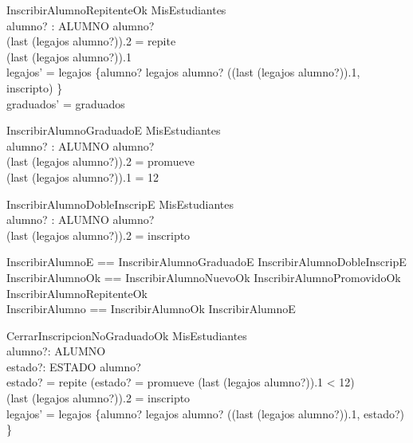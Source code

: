 \begin{schema}{InscribirAlumnoRepitenteOk}
    \Delta MisEstudiantes \\
    alumno? : ALUMNO
    \where
    alumno? \in {} \\
    (last \; (legajos \; alumno?)).2 = repite \\
    (last \; (legajos \; alumno?)).1  \\ 
    legajos' = legajos \oplus \{alumno? \mapsto legajos \; alumno? \cat \langle ((last \; (legajos \; alumno?)).1, inscripto) \rangle\} \\
    graduados' = graduados
\end{schema}

\begin{schema}{InscribirAlumnoGraduadoE}
    \Xi MisEstudiantes \\
    alumno? : ALUMNO
    \where
    alumno? \in {} \\
    (last \; (legajos \; alumno?)).2 = promueve \\
    (last \; (legajos \; alumno?)).1 = 12
\end{schema}

\begin{schema}{InscribirAlumnoDobleInscripE}
    \Xi MisEstudiantes \\
    alumno? : ALUMNO
    \where
    alumno? \in {} \\
    (last \; (legajos \; alumno?)).2 = inscripto
\end{schema}

\begin{zed}
    InscribirAlumnoE == InscribirAlumnoGraduadoE \lor InscribirAlumnoDobleInscripE \\
    InscribirAlumnoOk == InscribirAlumnoNuevoOk \lor InscribirAlumnoPromovidoOk \\ 
                         \lor InscribirAlumnoRepitenteOk \\
    InscribirAlumno == InscribirAlumnoOk \lor InscribirAlumnoE
\end{zed}

\begin{schema}{CerrarInscripcionNoGraduadoOk}
    \Delta MisEstudiantes \\
    alumno?: ALUMNO \\
    estado?: ESTADO
    \where
    alumno? \in {} \\
    estado? = repite \lor (estado? = promueve \land (last \; (legajos \; alumno?)).1 < 12) \\
    (last \; (legajos \; alumno?)).2 = inscripto \\
    legajos' = legajos \oplus \{alumno? \mapsto legajos \; alumno? \cat \langle ((last \; (legajos \; alumno?)).1, estado?) \rangle\}
\end{schema}

